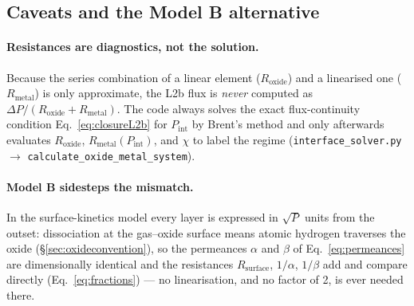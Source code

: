 \documentclass[11pt,a4paper]{article}
\newcommand{\Pint}{P_{\mathrm{int}}}
\newcommand{\Rsurf}{R_{\mathrm{surface}}}
\newcommand{\Rox}{R_{\mathrm{oxide}}}
\newcommand{\Rmet}{R_{\mathrm{metal}}}
\newcommand{\code}[1]{\texttt{#1}}
\begin{document}
\subsection{Caveats and the Model B alternative}

\paragraph{Resistances are diagnostics, not the solution.} Because the
series combination of a linear element ($\Rox$) and a linearised one
($\Rmet$) is only approximate, the L2b flux is \emph{never} computed as
$\Delta P/(\Rox + \Rmet)$. The code always solves the exact flux-continuity
condition Eq.~\eqref{eq:closureL2b} for $\Pint$ by Brent's method and only
afterwards evaluates $\Rox$, $\Rmet(\Pint)$, and $\chi$ to label the regime
(\code{interface\_solver.py} $\rightarrow$
\code{calculate\_oxide\_metal\_system}).

\paragraph{Model B sidesteps the mismatch.} In the surface-kinetics model
every layer is expressed in $\sqrt{P}$ units from the outset: dissociation at
the gas--oxide surface means atomic hydrogen traverses the oxide
(\S\ref{sec:oxideconvention}), so the permeances $\alpha$ and $\beta$ of
Eq.~\eqref{eq:permeances} are dimensionally identical and the resistances
$\Rsurf$, $1/\alpha$, $1/\beta$ add and compare directly
(Eq.~\eqref{eq:fractions}) --- no linearisation, and no factor of 2, is ever
needed there.
\end{document}
